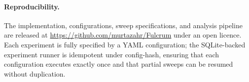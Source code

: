 \paragraph{Reproducibility.}
The implementation, configurations, sweep specifications, and analysis
pipeline are released at
\url{https://github.com/murtazahr/Fulcrum} under an open licence. Each
experiment is fully specified by a YAML configuration; the SQLite-backed
experiment runner is idempotent under config-hash, ensuring that each
configuration executes exactly once and that partial sweeps can be
resumed without duplication.
